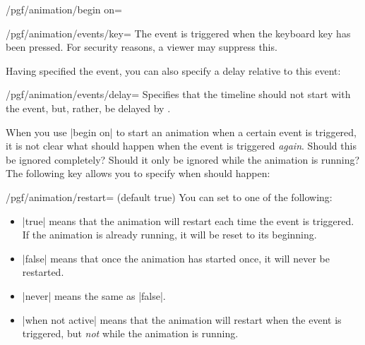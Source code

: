 \begin{key}{/pgf/animation/begin on=}
  \begin{key}{/pgf/animation/events/key=}
    The event is triggered when the keyboard key  has been
    pressed. For security reasons, a viewer may suppress this.
  \end{key}
  
  Having specified the event, you can also specify a delay relative to
  this event:

  \begin{key}{/pgf/animation/events/delay=}
    Specifies that the timeline should not start with the event, but,
    rather, be delayed by .
  \end{key}
  
\end{key}

When you use |begin on| to start an animation when a certain event is
triggered, it is not clear what should happen when the event is
triggered \emph{again}. Should this be ignored completely? Should it
only be ignored while the animation is running? The following key
allows you to specify when should happen:

\begin{key}{/pgf/animation/restart= (default true)}
  You can set  to one of the following:
  \begin{itemize}
  \item |true| means that the animation will restart each time the
    event is triggered. If the animation is already running, it will
    be reset to its beginning.
  \item |false| means that once the animation has started once, it
    will never be restarted.
\begin{codeexample}[width=2cm]
\end{codeexample}  
  \item |never| means the same as |false|.
  \item |when not active| means that the animation will restart when
    the event is triggered, but \emph{not} while the animation is
    running.     
\begin{codeexample}[width=2cm]
\end{codeexample}  
  \end{itemize}
\end{key}


